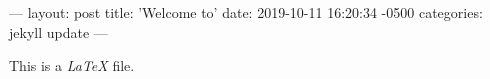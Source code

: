 ---
layout: post
title:  'Welcome to'
date:   2019-10-11 16:20:34 -0500
categories: jekyll update
---

This is a \emph{LaTeX} file.